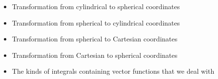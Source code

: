 \begin{ELunit}

\begin{itemize}
\tightlist
\item
  Transformation from cylindrical to spherical coordinates
\end{itemize}


\begin{itemize}
\tightlist
\item
  Transformation from spherical to cylindrical coordinates
\end{itemize}


\begin{itemize}
\tightlist
\item
  Transformation from spherical to Cartesian coordinates
\end{itemize}


\begin{itemize}
\tightlist
\item
  Transformation from Cartesian to spherical coordinates
\end{itemize}



\end{ELunit}

\ELhold


\begin{ELunit}


\begin{itemize}
\tightlist
\item
  The kinds of integrals containing vector functions that we deal with
\end{itemize}


\end{ELunit}

